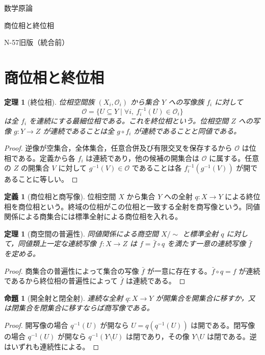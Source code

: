 \documentclass[a5paper,10pt,dvipdfmx]{jsarticle}
\theoremstyle{definition}
\newtheorem{defn}[ruledef]{定義}
\theoremstyle{plain}
\newtheorem{prop}[ruledef]{命題}
\newtheorem{thm}[ruledef]{定理}
\begin{document}
\begin{center}
{\small 数学原論}\par\vspace{4mm}
{\LARGE 商位相と終位相}\par\vspace{2mm}
{\small N-57\quad 旧版（統合前）}
\end{center}
\section{商位相と終位相}
\begin{thm}[終位相]\label{k258}
位相空間族 $(X_i,\mathcal O_i)$ から集合 $Y$ への写像族 $f_i$ に対して
\[
 \mathcal O=\{U\subseteq Y\mid \forall i,\ f_i^{-1}(U)\in\mathcal O_i\}
\]
は全 $f_i$ を連続にする最細位相である。これを終位相という。位相空間 $Z$ への写像 $g\colon Y\to Z$ が連続であることは全 $g\circ f_i$ が連続であることと同値である。
\end{thm}
\begin{proof}
逆像が空集合，全体集合，任意合併及び有限交叉を保存するから $\mathcal O$ は位相である。定義から各 $f_i$ は連続であり，他の候補の開集合は $\mathcal O$ に属する。任意の $Z$ の開集合 $V$ に対して $g^{-1}(V)\in\mathcal O$ であることは各 $f_i^{-1}(g^{-1}(V))$ が開であることに等しい。
\end{proof}
\begin{defn}[商位相と商写像]\label{k259}
位相空間 $X$ から集合 $Y$ への全射 $q\colon X\to Y$ による終位相を商位相という。終域の位相がこの位相と一致する全射を商写像という。同値関係による商集合には標準全射による商位相を入れる。
\end{defn}
\begin{thm}[商空間の普遍性]\label{k260}
同値関係による商空間 $X/{\sim}$ と標準全射 $q$ に対して，同値類上一定な連続写像 $f\colon X\to Z$ は $f=\bar f\circ q$ を満たす一意の連続写像 $\bar f$ を定める。
\end{thm}
\begin{proof}
商集合の普遍性によって集合の写像 $\bar f$ が一意に存在する。$\bar f\circ q=f$ が連続であるから終位相の普遍性によって $\bar f$ は連続である。
\end{proof}
\begin{prop}[開全射と閉全射]\label{k261}
連続な全射 $q\colon X\to Y$ が開集合を開集合に移すか，又は閉集合を閉集合に移すならば商写像である。
\end{prop}
\begin{proof}
開写像の場合 $q^{-1}(U)$ が開なら $U=q(q^{-1}(U))$ は開である。閉写像の場合 $q^{-1}(U)$ が開なら $q^{-1}(Y\setminus U)$ は閉であり，その像 $Y\setminus U$ は閉である。逆はいずれも連続性による。
\end{proof}
\end{document}
